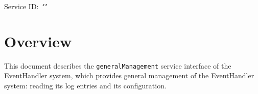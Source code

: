 \documentclass[a4paper]{arrowhead}
\begin{document}
\sloppy

\ArrowheadSetup

\begin{center}
  \vspace*{1cm}
  \huge{\arrowtitle}

  \vspace*{0.2cm}
  \LARGE{\arrowtype}
  \vspace*{1cm}

  \Large{Service ID: \textit{"\arrowid"}}

  \vspace*{\fill}


  \vspace*{1cm}
  \vspace*{\fill}

  \begin{abstract}
    This document describes the HTTP/1.1 protocol with TLS payload security and JSON payload encoding variant of the \texttt{generalManagement} service of the EventHandler system.
  \end{abstract}

  \vspace*{1cm}
\end{center}

\newpage

\tableofcontents
\newpage

\section{Overview}
\label{sec:overview}

This document describes the \texttt{generalManagement} service interface of the EventHandler system, which provides general management of the EventHandler system: reading its log entries and its configuration.
\end{document}
